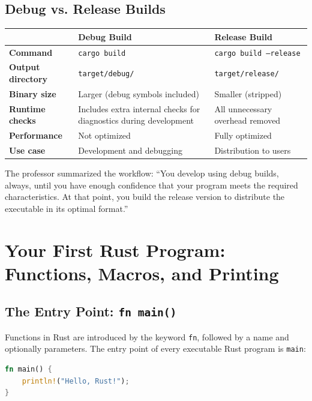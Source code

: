 \subsection{Debug vs. Release Builds}

\begin{center}
\begin{tabular}{|l|p{5.5cm}|p{5.5cm}|}
\hline
& \textbf{Debug Build} & \textbf{Release Build} \\
\hline
\textbf{Command} & \texttt{cargo build} & \texttt{cargo build --release} \\
\hline
\textbf{Output directory} & \texttt{target/debug/} & \texttt{target/release/} \\
\hline
\textbf{Binary size} & Larger (debug symbols included) & Smaller (stripped) \\
\hline
\textbf{Runtime checks} & Includes extra internal checks for diagnostics during development & All unnecessary overhead removed \\
\hline
\textbf{Performance} & Not optimized & Fully optimized \\
\hline
\textbf{Use case} & Development and debugging & Distribution to users \\
\hline
\end{tabular}
\end{center}

The professor summarized the workflow: ``You develop using debug builds, always, until you have enough confidence that your program meets the required characteristics. At that point, you build the release version to distribute the executable in its optimal format.''

\section{Your First Rust Program: Functions, Macros, and Printing}

\subsection{The Entry Point: \texttt{fn main()}}

Functions in Rust are introduced by the keyword \texttt{fn}, followed by a name and optionally parameters. The entry point of every executable Rust program is \texttt{main}:

\begin{lstlisting}[language=Rust]
fn main() {
    println!("Hello, Rust!");
}
\end{lstlisting}

